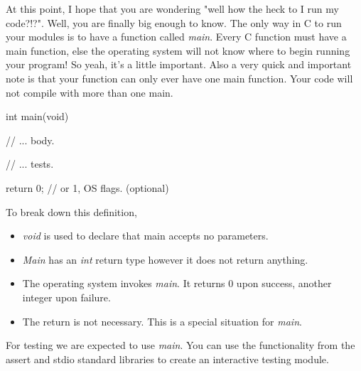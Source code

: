 
At this point, I hope that you are wondering "well how the heck to I run my code?!?".  Well, you are finally big enough to know.  The only way in C to run your modules is to have a function called \emph{main}.  Every C function must have a main function, else the operating system will not know where to begin running your program!  So yeah, it's a little important.  Also a very quick and important note is that your function can only ever have one main function.  Your code will not compile with more than one main.\\



\begin{code}[C]
int main(void) 
{
	// ... body.
	
	// ... tests.	
	
	return 0; // or 1, OS flags. (optional)
}
\end{code}

To break down this definition,\\

\begin{itemize}

\item \emph{void} is used to declare that main accepts no parameters.
\item \emph{Main} has an \emph{int} return type however it does not return anything.
\item The operating system invokes \emph{main}.  It returns 0 upon success, another integer upon failure.
\item The return is not necessary. This is a special situation for \emph{main}.

\end{itemize}

For testing we are expected to use \emph{main}. You can use the functionality from the assert and stdio standard libraries to create an interactive testing module.\\


